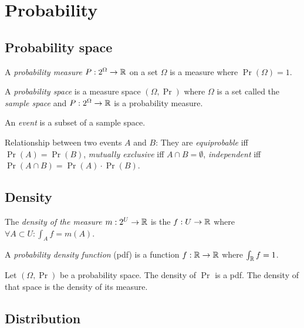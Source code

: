 \chapter{Probability}

\section{Probability space}

%
%
%
A \emph{probability measure} \(P : 2^\Omega \to \mathbb{R}\) on a set \(\Omega\) is a measure where \(\Pr(\Omega) = 1\).

%
%
%
A \emph{probability space} is a measure space \((\Omega,\Pr)\) where
\(\Omega\) is a set called the
%
%
%
\emph{sample space}
and \(P : 2^\Omega \to \mathbb{R}\) is a probability measure.

%
An \emph{event} is a subset of a sample space.

Relationship between two events \(A\) and \(B\):
They are
%
%
\emph{equiprobable} iff \(\Pr(A) = \Pr(B)\),
%
%
\emph{mutually exclusive} iff \(A \cap B = \emptyset\),
%
%
\emph{independent} iff \(\Pr(A \cap B) = \Pr(A) \cdot \Pr(B)\).

\section{Density}

%
The \emph{density of the measure \(m : 2^U \to \mathbb{R}\)}
is the \(f : U \to \mathbb{R}\) where \(\forall A \subset U : \int_A f = m(A)\).

%
A \emph{probability density function} (pdf) is a function \(f : \mathbb{R} \to \mathbb{R}\) where \(\int_{\mathbb{R}} f = 1\).

Let \((\Omega,\Pr)\) be a probability space.
The density of \(\Pr\) is a pdf.
The density of that space is the density of its measure.

\section{Distribution}

